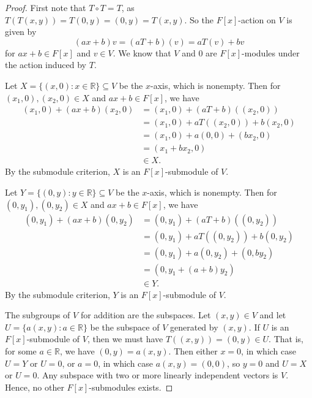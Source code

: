 \documentclass[12pt]{article}
\theoremstyle{definition}
\newcommand{\R}{\mathbb{R}}
\begin{document}
\begin{proof}
    First note that $T\circ T = T$, as $T(T(x,y)) = T(0,y) = (0,y) = T(x, y)$. So the $F[x]$-action on $V$ is given by
    \[
        (ax + b)v
            = (aT + b)(v)
            = aT(v) + bv
    \]
    for $ax + b \in F[x]$ and $v \in V$. We know that $V$ and $0$ are $F[x]$-modules under the action induced by $T$.
    
    Let $X = \{(x, 0) : x \in \R\} \subseteq V$ be the $x$-axis, which is nonempty. Then for $(x_1, 0), (x_2, 0) \in X$ and $ax + b \in F[x]$, we have
    \begin{align*}
        (x_1, 0) + (ax + b)(x_2, 0)
            &= (x_1, 0) + (aT + b)((x_2, 0)) \\
            &= (x_1, 0) + aT((x_2, 0)) + b(x_2, 0) \\
            &= (x_1, 0) + a(0, 0) + (bx_2, 0) \\
            &= (x_1 + bx_2, 0) \\
            &\in X.
    \end{align*}
    By the submodule criterion, $X$ is an $F[x]$-submodule of $V$.
    
    Let $Y = \{(0, y) : y \in \R\} \subseteq V$ be the $x$-axis, which is nonempty. Then for $(0, y_1), (0, y_2) \in X$ and $ax + b \in F[x]$, we have
    \begin{align*}
        (0, y_1) + (ax + b)(0, y_2)
            &= (0, y_1) + (aT + b)((0, y_2)) \\
            &= (0, y_1) + aT((0, y_2)) + b(0, y_2) \\
            &= (0, y_1) + a(0, y_2) + (0, by_2) \\
            &= (0, y_1 + (a+b)y_2) \\
            &\in Y.
    \end{align*}
    By the submodule criterion, $Y$ is an $F[x]$-submodule of $V$.
    
    The subgroups of $V$ for addition are the subspaces. Let $(x, y) \in V$ and let $U = \{a(x, y) : a \in \R\}$ be the subspace of $V$ generated by $(x, y)$. If $U$ is an $F[x]$-submodule of $V$, then we must have $T((x, y)) = (0, y) \in U$. That is, for some $a \in \R$, we have $(0, y) = a(x, y)$. Then either $x = 0$, in which case $U = Y$ or $U = 0$, or $a = 0$, in which case $a(x, y) = (0, 0)$, so $y = 0$ and $U = X$ or $U = 0$. Any subspace with two or more linearly independent vectors is $V$. Hence, no other $F[x]$-submodules exists.
    
\end{proof}
\end{document}
